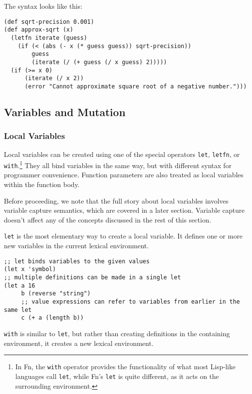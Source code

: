 \documentclass[11pt]{article}
\begin{document}
The syntax looks like this:

\begin{verbatim}
(def sqrt-precision 0.001)
(def approx-sqrt (x)
  (letfn iterate (guess)
    (if (< (abs (- x (* guess guess)) sqrt-precision))
        guess
        (iterate (/ (+ guess (/ x guess) 2)))))
  (if (>= x 0)
      (iterate (/ x 2))
      (error "Cannot approximate square root of a negative number.")))
\end{verbatim}


\subsection{Variables and Mutation}
\label{sec:orga508ab5}

\subsubsection{Local Variables}
\label{sec:orgc302283}

Local variables can be created using one of the special operators \texttt{let}, \texttt{letfn}, or
\texttt{with}.\footnote{In Fn, the \texttt{with} operator provides the functionality of what
most Lisp-like languages call \texttt{let}, while Fn's \texttt{let} is quite different, as it acts
on the surrounding environment.} They all bind variables in the same way, but with
different syntax for programmer convenience. Function parameters are also
treated as local variables within the function body.

Before proceeding, we note that the full story about local variables involves
variable capture semantics, which are covered in a later section. Variable
capture doesn't affect any of the concepts discussed in the rest of this section.

\texttt{let} is the most elementary way to create a local variable. It defines one or
more new variables in the current lexical environment.

\begin{verbatim}
;; let binds variables to the given values
(let x 'symbol)
;; multiple definitions can be made in a single let
(let a 16
     b (reverse "string")
     ;; value expressions can refer to variables from earlier in the same let
     c (+ a (length b))
\end{verbatim}

\texttt{with} is similar to \texttt{let}, but rather than creating definitions in the containing
environment, it creates a new lexical environment.
\end{document}
